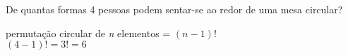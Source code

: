 \begin{ex}
 De quantas formas 4 pessoas podem sentar-se ao redor de uma mesa circular?
   \begin{sol}
     \phantom{A}
    permutação circular de \textit{n} elementos = $(n-1)!$ \\
    $(4-1)!=3!=6$
    
   \end{sol}
\end{ex}